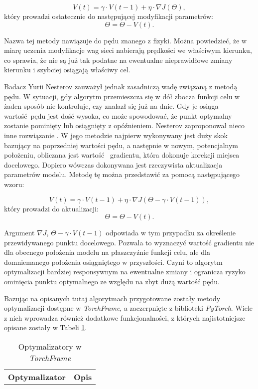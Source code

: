 \begin{enumerate}
    \[V(t)=\gamma \cdot V(t - 1) + \eta \cdot \nabla J(\Theta),\]
    który prowadzi ostatecznie do następującej modyfikacji parametrów:
    \[\Theta = \Theta - V(t).\]

    Nazwa tej metody nawiązuje do pędu znanego z fizyki. Można powiedzieć, że
    w miarę uczenia modyfikacje wag sieci nabierają prędkości we właściwym kierunku, co
    sprawia, że nie są już tak podatne na ewentualne nieprawidłowe zmiany kierunku i
    szybciej osiągają właściwy cel.

    Badacz Yurii Nesterov zauważył jednak zasadniczą wadę związaną z metodą pędu.
    W sytuacji, gdy algorytm przemieszcza się w dół zbocza funkcji celu w żaden
    sposób nie kontroluje, czy znalazł się już na dnie. Gdy je osiąga wartość pędu
    jest dość wysoka, co może spowodować, że punkt optymalny zostanie pominięty
    lub osiągnięty z opóźnieniem. Nesterov zaproponował nieco inne rozwiązanie \cite{Nesterov_momentum}.
    W jego metodzie najpierw wykonywany jest duży skok bazujący na poprzedniej
    wartości pędu, a następnie w nowym, potencjalnym położeniu, obliczana jest wartość 
    gradientu, która dokonuje korekcji miejsca docelowego. Dopiero wówczas dokonywana
    jest rzeczywista aktualizacja parametrów modelu. Metodę tę można przedstawić za
    pomocą następującego wzoru:

    \[V(t)=\gamma \cdot V(t - 1) + \eta \cdot \nabla J(\Theta - \gamma \cdot V(t - 1)),\]
    który prowadzi do aktualizacji:
    \[\Theta = \Theta - V(t).\]

    Argument $\nabla J$, $\Theta - \gamma \cdot V(t - 1)$ odpowiada w tym przypadku za określenie przewidywanego punktu docelowego.
    Pozwala to wyznaczyć wartość gradientu nie dla obecnego położenia modelu na płaszczyźnie
    funkcji celu, ale dla domniemanego położenia osiągniętego w przyszłości. Czyni to
    algorytm optymalizacji bardziej responsywnym na ewentualne zmiany i ogranicza ryzyko
    ominięcia punktu optymalnego ze względu na zbyt dużą wartość pędu.

    Bazując na opisanych tutaj algorytmach przygotowane zostały metody optymalizacji
    dostępne w \textit{TorchFrame}, a zaczerpnięte z biblioteki \textit{PyTorch}. Wiele z nich wprowadza
    również dodatkowe funkcjonalności, z których najistotniejsze opisane zostały w Tabeli \ref{tab:optimizers}.

  \begin{small}
    \begin{longtable}{ |m{3cm}|m{10cm}| }
      \caption{Optymalizatory w \textit{TorchFrame}}
      \label{tab:optimizers}
      \endfirsthead
      \endhead
     \hline
       \textbf{Optymalizator} & \textbf{Opis} \\


\end{longtable}
\end{small}
\end{enumerate}

